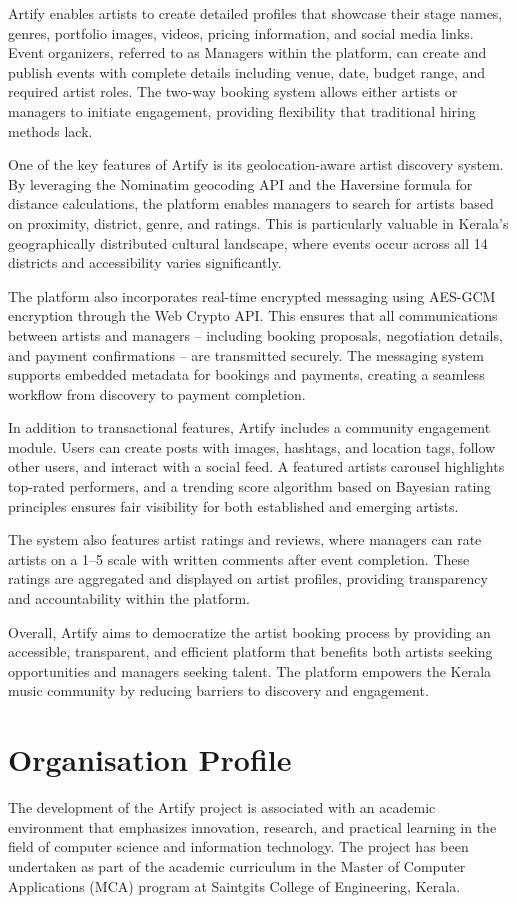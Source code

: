 \documentclass[12pt,a4paper]{report}
\begin{document}
Artify enables artists to create detailed profiles that showcase their stage names, genres, portfolio images, videos, pricing information, and social media links. Event organizers, referred to as Managers within the platform, can create and publish events with complete details including venue, date, budget range, and required artist roles. The two-way booking system allows either artists or managers to initiate engagement, providing flexibility that traditional hiring methods lack.

One of the key features of Artify is its geolocation-aware artist discovery system. By leveraging the Nominatim geocoding API and the Haversine formula for distance calculations, the platform enables managers to search for artists based on proximity, district, genre, and ratings. This is particularly valuable in Kerala's geographically distributed cultural landscape, where events occur across all 14 districts and accessibility varies significantly.

The platform also incorporates real-time encrypted messaging using AES-GCM encryption through the Web Crypto API. This ensures that all communications between artists and managers -- including booking proposals, negotiation details, and payment confirmations -- are transmitted securely. The messaging system supports embedded metadata for bookings and payments, creating a seamless workflow from discovery to payment completion.

In addition to transactional features, Artify includes a community engagement module. Users can create posts with images, hashtags, and location tags, follow other users, and interact with a social feed. A featured artists carousel highlights top-rated performers, and a trending score algorithm based on Bayesian rating principles ensures fair visibility for both established and emerging artists.

The system also features artist ratings and reviews, where managers can rate artists on a 1--5 scale with written comments after event completion. These ratings are aggregated and displayed on artist profiles, providing transparency and accountability within the platform.

Overall, Artify aims to democratize the artist booking process by providing an accessible, transparent, and efficient platform that benefits both artists seeking opportunities and managers seeking talent. The platform empowers the Kerala music community by reducing barriers to discovery and engagement.

\section{Organisation Profile}
The development of the Artify project is associated with an academic environment that emphasizes innovation, research, and practical learning in the field of computer science and information technology. The project has been undertaken as part of the academic curriculum in the Master of Computer Applications (MCA) program at Saintgits College of Engineering, Kerala.
\end{document}
